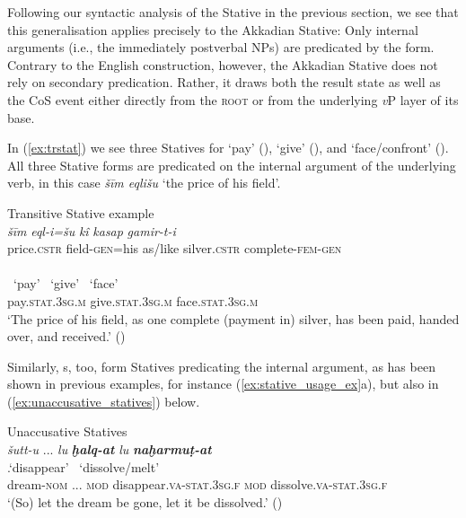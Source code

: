 \documentclass[output=paper,colorlinks,citecolor=brown]{langscibook}
\begin{document}
 Following our syntactic analysis of the Stative in the previous section, we see that this generalisation applies precisely to the Akkadian Stative: Only internal arguments (i.e., the immediately postverbal NPs) are predicated by the form. Contrary to the English  construction, however, the Akkadian Stative does not rely on secondary predication. Rather, it draws both the result state as well as the CoS  event either directly from the \textsc{root} or from the underlying \textit{v}P layer of its base.

In (\ref{ex:trstat}) we see three   Statives for `pay' (), `give' (), and `face/confront' (). All three Stative forms are predicated on the internal argument of the underlying verb, in this case \textit{šīm eqlišu} `the price of his field'. 

\begin{exe}
    \ex \label{ex:trstat} Transitive Stative example\\
    \gll \textit{šīm} \textit{eql-i=šu} \textit{kî} \textit{kasap} \textit{gamir-t-i}\\
     price.\textsc{cstr} field-\textsc{gen}=his as/like silver.\textsc{cstr} complete-\textsc{fem-gen}\\
   \glll \textbf{} \textbf{} \textbf{}\\
~`pay' ~`give' ~`face'\\
     pay.\textsc{stat.3sg.m} give.\textsc{stat.3sg.m} face.\textsc{stat.3sg.m}\\
    \glt `The price of his field, as one complete (payment in) silver, has been paid, handed over, and received.' (\citealt[38, 19]{Scheil1927})
\end{exe}


Similarly, s, too, form Statives predicating the internal argument, as has been shown in previous examples, for instance (\ref{ex:stative_usage_ex}a), but also in (\ref{ex:unaccusative_statives}) below.

\begin{exe}  \ex Unaccusative  Statives\\\label{ex:unaccusative_statives}
     \glll \textit{šutt-u} ... \textit{lu} {\textit{\textbf{ḫalq-at}} } \textit{lu} {\textit{\textbf{naḫarmuṭ-at}} }\\
     {} {} {} .`disappear' {} ~`dissolve/melt'\\
     dream-\textsc{nom} ... \textsc{mod} disappear.\textsc{va-stat.3sg.f} \textsc{mod} dissolve.\textsc{va-stat.3sg.f}\\
    \glt `(So) let the dream be gone, let it be dissolved.' ()
\end{exe}
\end{document}
